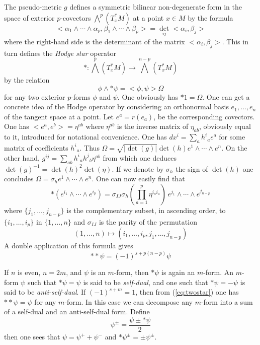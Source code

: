 \documentclass[12pt,titlepage]{article}
\begin{document}
The pseudo-metric \(g\) defines a symmetric bilinear non-degenerate form
in the space of exterior 
\(p\)-covectors \(\bigwedge^p(T_x^*M)\) at a point \(x\in M\) by
the formula
\[%
<\alpha_1\wedge\cdots\wedge\alpha_p , \beta_1\wedge\cdots\wedge\beta_p> =
\det _{ij}<\alpha_i,\beta_j>
\]%
where the right-hand side is the determinant of the matrix
\(<\alpha_i,\beta_j>\).
This in turn defines the {\em Hodge star\/}
%
 operator
\[
*:{\textstyle \bigwedge^p}(T_x^*M) \to {\textstyle
\bigwedge^{n-p}}(T_x^*M)
\]
by the relation
\begin{equation}\label{eq:hodgestar}%
\phi \wedge *\psi = <\phi,\psi>\Omega
\end{equation}%
for any two  exterior \(p\)-forms \(\phi\) and \(\psi\). One obviously has
\(*1=\Omega\).
One can get a concrete idea of the Hodge operator by considering an 
orthonormal basis 
 \(e_1,\dots,e_n\) of the tangent space at a point. Let \(e^a = r(e_a)\), 
be the corresponding covectors.
One has \(<e^a,e^b> = \eta^{ab}\) where \(\eta^{ab}\) is the inverse
matrix of \(\eta_{ab}\), obviously equal to it, introduced for
notational convenience. One has \(dx^i = \sum_ah^i{}_ae^a\) for some
matrix of coefficients \(h^i{}_a\). Thus \(\Omega =
\sqrt{|\det(g)|}\det(h)e^1\wedge\cdots\wedge e^n\). On the other hand,
\(g^{ij} = \sum_{ab} h^i{}_ah^j{}_b\eta^{ab}\) from which one deduces
\(\det(g)^{-1}=\det(h)^2 \det(\eta)\). If we denote by \(\sigma_h\) the
sign of \(\det(h)\) one concludes \(\Omega = \sigma_he^1\wedge
\cdots\wedge e^n\). One can now easily find that
\begin{equation}%
*(e^{i_1}\wedge\cdots\wedge e^{i_p})   =
\sigma_{IJ}\sigma_h({\textstyle \prod_{a=1}^p}\eta^{i_ai_a}) \,
e^{j_1}\wedge\cdots\wedge e^{j_{n-p}}
\end{equation}%
where \(\{j_1,\dots,j_{n-p}\}\) is the complementary subset,
in ascending order, to
\(\{i_1,\dots,i_{p}\}\)  in \(\{1,\dots,n\}\) and \(\sigma_{IJ}\) is
the
parity of the permutation
\[
(1,\dots,n) \mapsto
(i_1,\dots,i_p,j_1,\dots,j_{n-p})
\]
A double application of this formula gives 
\begin{equation}\label{eq:twostar}%
**\psi =
(-1)^{s+p(n-p)}\psi
\end{equation}%


If \(n\) is even, \(n=2m\), and \(\psi\) is an \(m\)-form, then \(*\psi\)
is again an \(m\)-form. An \(m\)-form \(\psi\) such that \(*\psi=\psi\)
is said to be {\em self-dual\/}, 
%
and one such that  \(*\psi=-\psi\)
is said to be {\em anti-self-dual\/}. 
%
If \((-1)^{s+m}=1\), then
from (\ref{eq:twostar}) one has \(**\psi=\psi\) for any \(m\)-form. In
this case we can decompose any \(m\)-form into a sum of a self-dual and
an anti-self-dual form. Define
\[%
\psi^\pm = \frac{\psi\pm *\psi}{2}
\]%
then one sees that \(\psi=\psi^++\psi^-\) and \(*\psi^\pm=\pm\psi^\pm\).
%
%
\end{document}
